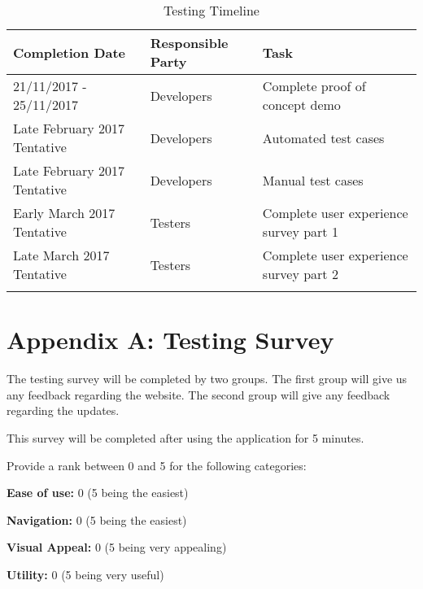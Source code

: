 \documentclass[12pt]{article}
\begin{document}
\begin{longtable}{|p{5cm}|p{5cm}|p{5cm}|}
\hline
\textbf{Completion Date} & \textbf{Responsible Party} & \textbf{Task} \\
\hline
21/11/2017 - 25/11/2017 & Developers  & Complete proof of concept demo \\
\hline
Late February 2017 Tentative & Developers  & Automated test cases \\
\hline
Late February 2017 Tentative & Developers  & Manual test cases \\
\hline
Early March 2017 Tentative & Testers & Complete user experience survey part 1 \\
\hline
Late March 2017 Tentative & Testers & Complete user experience survey part 2 \\
\hline

\caption{Testing Timeline}
\label{tab:testtimeline}
\end{longtable}

\newpage

\section{Appendix A: Testing Survey}
The testing survey will be completed by two groups. The first group will give us any feedback regarding the website. The second group will give any feedback regarding the updates.

\begin{tcolorbox}
This survey will be completed after using the application for 5 minutes.

Provide a rank between 0 and 5 for the following categories:

\textbf{Ease of use:} 0 (5 being the easiest)

\textbf{Navigation:} 0 (5 being the easiest)

\textbf{Visual Appeal:} 0 (5 being very appealing)

\textbf{Utility:} 0 (5 being very useful)

\end{tcolorbox}
\end{document}
